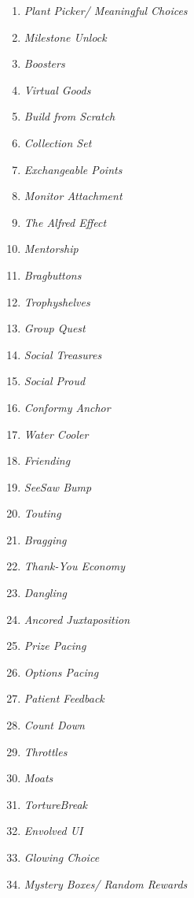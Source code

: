 \begin{multicols}{2}
\begin{enumerate}
        \item \textit{Plant Picker/ Meaningful Choices}
        \item \textit{Milestone Unlock}
        \item \textit{Boosters}
        \item \textit{Virtual Goods}
        \item \textit{Build from Scratch}
        \item \textit{Collection Set}
        \item \textit{Exchangeable Points}
        \item \textit{Monitor Attachment}
        \item \textit{The Alfred Effect}
        \item \textit{Mentorship}
        \item \textit{Bragbuttons}
        \item \textit{Trophyshelves}
        \item \textit{Group Quest}
        \item \textit{Social Treasures}
        \item \textit{Social Proud}
        \item \textit{Conformy Anchor}
        \item \textit{Water Cooler}
        \item \textit{Friending}
        \item \textit{SeeSaw Bump}
        \item \textit{Touting}
        \item \textit{Bragging}
        \item \textit{Thank-You Economy}
        \item \textit{Dangling}
        \item \textit{Ancored Juxtaposition}
        \item \textit{Prize Pacing}
        \item \textit{Options Pacing}
        \item \textit{Patient Feedback}
        \item \textit{Count Down}
        \item \textit{Throttles}
        \item \textit{Moats}
        \item \textit{TortureBreak}
        \item \textit{Envolved UI}
        \item \textit{Glowing Choice}
        \item \textit{Mystery Boxes/ Random Rewards}

\end{enumerate}
\end{multicols}
